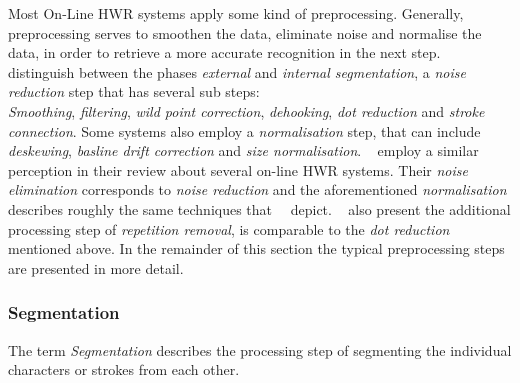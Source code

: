 
Most On-Line HWR systems apply some kind of preprocessing. Generally, 
preprocessing serves to smoothen the data, eliminate noise and normalise the
data, in order to retrieve a more accurate recognition in the next step.
~\citeyear{Tappert1990} distinguish between the phases \emph{external} and 
\emph{internal segmentation}, a \emph{noise reduction} step that has several 
sub steps:\\
\emph{Smoothing}, \emph{filtering}, \emph{wild point correction}, 
\emph{dehooking}, \emph{dot reduction} and \emph{stroke connection}.
Some systems also employ a \emph{normalisation} step, that can include
\emph{deskewing}, \emph{basline drift correction} and \emph{size normalisation}.
~\citeyear{Santosh2009} employ a similar perception in their review about several
on-line HWR systems. Their \emph{noise elimination} corresponds to 
\emph{noise reduction} and the aforementioned \emph{normalisation} describes 
roughly the same techniques that~~\citeyear{Tappert1990} depict.
~\citeyear{Santosh2009} also present the additional processing step of 
\emph{repetition removal}, is comparable to the \emph{dot reduction} mentioned 
above. In the remainder of this section the typical preprocessing steps are 
presented in more detail.

\subsubsection{Segmentation}
\label{sec:segmentation}

The term \emph{Segmentation} describes the processing step of segmenting the 
individual characters or strokes from each other.

